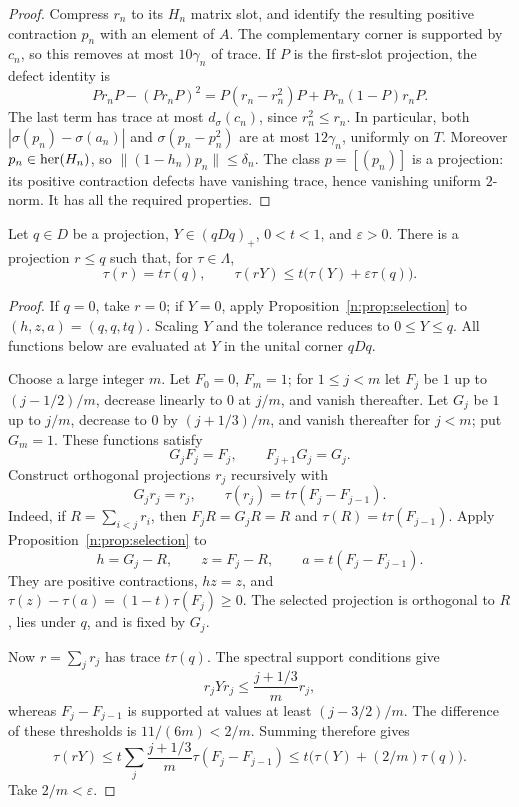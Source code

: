 \begin{proof}
Compress $r_n$ to its $H_n$ matrix slot, and identify the resulting
positive contraction $p_n$ with an element of $A$. The complementary
corner is supported by $c_n$, so this removes at most $10\gamma_n$ of
trace. If $P$ is the first-slot projection, the defect identity is
\[
 Pr_nP-(Pr_nP)^2
 =P(r_n-r_n^2)P+Pr_n(1-P)r_nP.
\]
The last term has trace at most $d_\sigma(c_n)$, since $r_n^2\le r_n$.
In particular, both $|\sigma(p_n)-\sigma(a_n)|$ and
$\sigma(p_n-p_n^2)$ are at most $12\gamma_n$, uniformly on $T$.
Moreover $p_n\in\operatorname{her}(H_n)$, so $\|(1-h_n)p_n\|\le\delta_n$.
The class $p=[(p_n)]$ is a projection: its positive contraction defects
have vanishing trace, hence vanishing uniform $2$-norm. It has all the
required properties.
\end{proof}

\begin{lemma}\label{n:lem:cost}
Let $q\in D$ be a projection, $Y\in(qDq)_+$, $0<t<1$, and
$\varepsilon>0$. There is a projection $r\le q$ such that, for $\tau\in \Lambda$,
\begin{equation}\label{n:eq:cost-corner}
 \tau(r)=t\tau(q),\qquad
 \tau(rY)\le t\bigl(\tau(Y)+\varepsilon\tau(q)\bigr).
\end{equation}
\end{lemma}
\begin{proof}
If $q=0$, take $r=0$; if $Y=0$, apply Proposition~\ref{n:prop:selection}
to $(h,z,a)=(q,q,tq)$. Scaling $Y$ and the tolerance reduces to
$0\le Y\le q$. All functions below are evaluated at $Y$ in the unital
corner $qDq$.

Choose a large integer $m$. Let $F_0=0$, $F_m=1$; for $1\le j<m$ let
$F_j$ be $1$ up to $(j-1/2)/m$, decrease linearly to $0$ at $j/m$, and
vanish thereafter. Let $G_j$ be $1$ up to $j/m$, decrease to $0$ by
$(j+1/3)/m$, and vanish thereafter for $j<m$; put $G_m=1$. These functions
satisfy
\[
 G_jF_j=F_j,\qquad F_{j+1}G_j=G_j.
\]
Construct orthogonal projections $r_j$ recursively with
\[
 G_jr_j=r_j,\qquad \tau(r_j)=t\tau(F_j-F_{j-1}).
\]
Indeed, if $R=\sum_{i<j}r_i$, then $F_jR=G_jR=R$ and
$\tau(R)=t\tau(F_{j-1})$. Apply Proposition~\ref{n:prop:selection} to
\[
 h=G_j-R,\qquad z=F_j-R,\qquad a=t(F_j-F_{j-1}).
\]
They are positive contractions, $hz=z$, and
$\tau(z)-\tau(a)=(1-t)\tau(F_j)\ge0$. The selected projection is
orthogonal to $R$, lies under $q$, and is fixed by $G_j$.

Now $r=\sum_jr_j$ has trace $t\tau(q)$. The spectral support conditions
give
\[
 r_jYr_j\le\frac{j+1/3}{m}r_j,
\]
whereas $F_j-F_{j-1}$ is supported at values at least $(j-3/2)/m$.
The difference of these thresholds is $11/(6m)<2/m$. Summing therefore
gives
\[
 \tau(rY)\le t\sum_j\frac{j+1/3}{m}\tau(F_j-F_{j-1})
       \le t\bigl(\tau(Y)+(2/m)\tau(q)\bigr).
\]
Take $2/m<\varepsilon$.
\end{proof}

